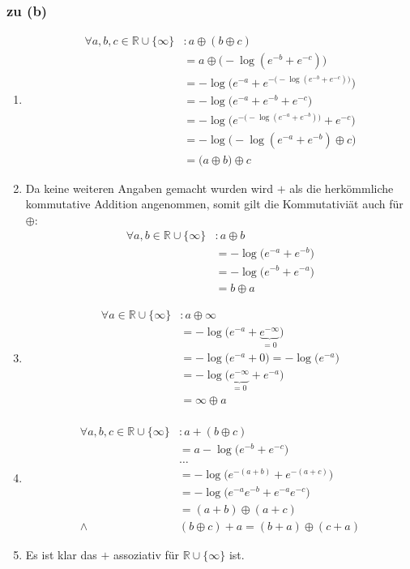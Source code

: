 \documentclass{scrartcl}
\begin{document}
\subsubsection{zu (b)}

\renewcommand{\baseset}{\mathbb{R} \cup \{\infty\}}
\begin{enumerate}
    \item \begin{align*}
        \forall a, b, c \in \baseset&: a \oplus (b \oplus c)\\
            &= a \oplus \big(-\log(e^{-b} + e^{-c})\big)\\
            &= -\log\Big(e^{-a} + e^{-\big(-\log(e^{-b} + e^{-c})\big)}\Big)\\
            &= -\log\Big(e^{-a} + e^{-b} + e^{-c}\Big)\\
            &= -\log\Big(e^{-\big(-\log(e^{-a} + e^{-b})\big)} + e^{-c}\Big)\\
            &= -\log\big(-\log(e^{-a} + e^{-b}) \oplus c\big)\\
            &= \big(a \oplus b\big) \oplus c
    \end{align*}
    \item Da keine weiteren Angaben gemacht wurden wird $+$ als die herkömmliche kommutative Addition angenommen, somit gilt die Kommutativiät auch für $\oplus$:
    \begin{align*}
        \forall a, b \in \baseset&: a \oplus b\\
            &= -\log\big(e^{-a} + e^{-b}\big)\\
            &= -\log\big(e^{-b} + e^{-a}\big)\\
            &= b \oplus a
    \end{align*}
    \item \begin{align*}
        \forall a \in \baseset&: a \oplus \infty\\
            &= -\log\big(e^{-a} + \underbrace{e^{-\infty}}_{= 0}\big)\\
            &= -\log\big(e^{-a} + 0\big) = -\log\big(e^{-a}\big)\\
            &= -\log\big(\underbrace{e^{-\infty}}_{= 0} + e^{-a}\big)\\
            &= \infty \oplus a\\
    \end{align*}
    \item \begin{align*}
        \forall a, b, c \in \baseset&: a + (b \oplus c)\\
            &= a -\log\big(e^{-b} + e^{-c}\big)\\
            &\ldots\\
            &= -\log\Big(e^{-(a+b)} + e^{-(a+c)}\Big)\\
            &= -\log\Big(e^{-a}e^{-b} + e^{-a}e^{-c}\Big)\\
            &= (a + b) \oplus (a + c)\\
            \land\quad& (b \oplus c) + a = (b + a) \oplus (c + a)
    \end{align*}
    \item Es ist klar das $+$ assoziativ für $\baseset$ ist.
\end{enumerate}
\end{document}
